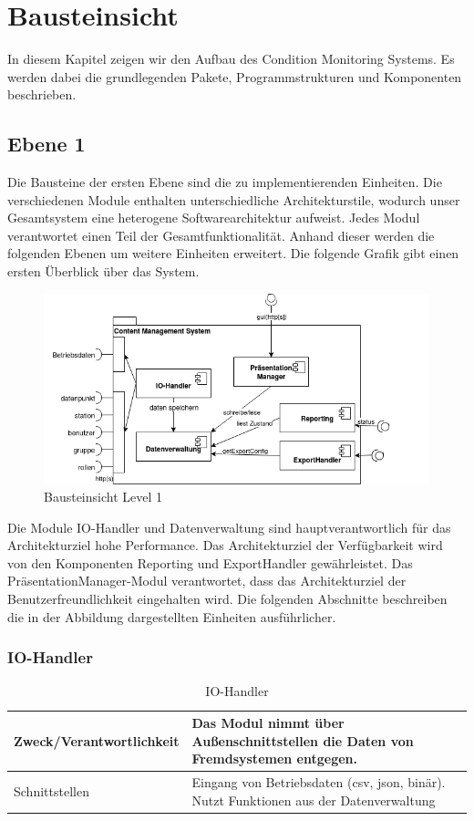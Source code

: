 \chapter{Bausteinsicht}
In diesem Kapitel zeigen wir den Aufbau des Condition Monitoring Systems. Es werden dabei die grundlegenden Pakete, Programmstrukturen und Komponenten beschrieben.
\section{Ebene 1}
Die Bausteine der ersten Ebene sind die zu implementierenden Einheiten. Die verschiedenen Module enthalten unterschiedliche Architekturstile, wodurch unser Gesamtsystem eine heterogene Softwarearchitektur aufweist. Jedes Modul verantwortet einen Teil der Gesamtfunktionalität. Anhand dieser werden die folgenden Ebenen um weitere Einheiten erweitert. Die folgende Grafik gibt einen ersten Überblick über das System.
\begin{figure}[h]
	\centering
	\includegraphics[width=1.0\textwidth]{Graphics/bausteinansicht_ebene_1.png}
	\caption{Bausteinsicht Level 1}
	\label{fig:bausteinsichtlvl1}
\end{figure}
Die Module IO-Handler und Datenverwaltung sind hauptverantwortlich für das Architekturziel hohe Performance.
Das Architekturziel der Verfügbarkeit wird von den Komponenten Reporting und ExportHandler gewährleistet. 
Das PräsentationManager-Modul verantwortet, dass das Architekturziel der Benutzerfreundlichkeit eingehalten wird.
Die folgenden Abschnitte beschreiben die in der Abbildung dargestellten Einheiten ausführlicher.
\clearpage
\subsection{IO-Handler}
\begin{table}[th]
	\begin{tabularx}{\textwidth}{p{5cm} X}
		\hline
		 Zweck/Verantwortlichkeit & Das Modul nimmt über Außenschnittstellen die Daten von Fremdsystemen entgegen. \\
		 \hline
		 Schnittstellen &  Eingang von Betriebsdaten (csv, json, binär). Nutzt Funktionen aus der Datenverwaltung \\
		 \hline
	\end{tabularx} 
	\caption{IO-Handler}
	\label{tab:IO-Handler}
\end{table}

